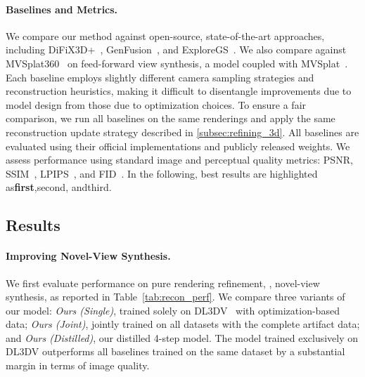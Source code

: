 \paragraph{Baselines and Metrics.}
We compare our method against open-source, state-of-the-art approaches, including  DiFiX3D+~\cite{wu2025difix3d},  GenFusion~\cite{Wu2025GenFusion}, and ExploreGS~\cite{Kim_2025_ExploreGS}. We also compare against MVSplat360~\cite{chen2024mvsplat360} on feed-forward view synthesis, a model coupled with MVSplat~\cite{chen2024mvsplat}. Each baseline employs slightly different camera sampling strategies and reconstruction heuristics, making it difficult to disentangle improvements due to model design from those due to optimization choices. 
To ensure a fair comparison, we run all baselines on the same renderings and apply the same reconstruction update strategy described in \cref{subsec:refining_3d}. 
All baselines are evaluated using their official implementations and publicly released weights. 
We assess performance using standard image and perceptual quality metrics: PSNR, SSIM~\cite{ssim}, LPIPS~\cite{lpips}, and FID~\cite{NIPS2017_8a1d6947}. In the following, best results are highlighted as\colorbox{colorFst}{\bf first},\colorbox{colorSnd}{second}, and\colorbox{colorTrd}{third}.





 






\subsection{Results}
\paragraph{Improving Novel-View Synthesis.}
We first evaluate performance on pure rendering refinement, \ie, novel-view synthesis, as reported in Table~\ref{tab:recon_perf}. We compare three variants of our model: \textit{Ours (Single)}, trained solely on DL3DV~\cite{ling2024dl3dv} with optimization-based data; \textit{Ours (Joint)}, jointly trained on all datasets with the complete artifact data; and \textit{Ours (Distilled)}, our distilled 4-step model. The model trained exclusively on DL3DV outperforms all baselines trained on the same dataset by a substantial margin in terms of image quality.

